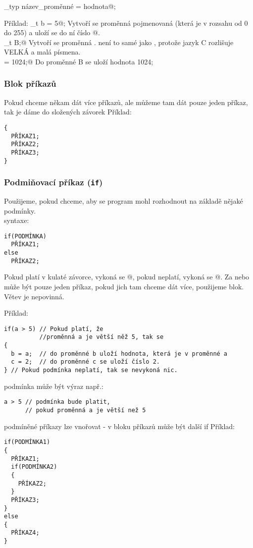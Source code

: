   _typ název_proměnné = hodnota@;

 Příklad: _t b = 5@;  Vytvoří se proměnná pojmenovaná \verb@b@ (která je v rozsahu od 0 do 255) a uloží se do ní číslo @. \\
_t B;@  Vytvoří se proměnná \verb@B@. \verb@B@ není to samé jako \verb@b@, protože jazyk C rozlišuje VELKÁ a malá písmena. \\
\verb@B = 1024;@  Do proměnné B se uloží hodnota 1024;

\subsubsection{Blok příkazů} 
Pokud chceme někam dát více příkazů, ale můžeme tam dát pouze jeden příkaz, tak je dáme do složených závorek
Příklad: \\ 
\begin{verbatim}
{
  PŘÍKAZ1;
  PŘÍKAZ2;
  PŘÍKAZ3;
}
\end{verbatim}



\subsubsection{Podmiňovací příkaz (\texttt{if})} \label{if1}

Použijeme, pokud chceme, aby se program mohl rozhodnout na základě nějaké podmínky. \\ 
syntaxe:

\begin{verbatim}
if(PODMÍNKA)
  PŘÍKAZ1;
else
  PŘÍKAZ2;
\end{verbatim}

Pokud platí  v kulaté závorce, vykoná se @, pokud neplatí, vykoná se @.
Za \verb@if@ nebo \verb@else@ může být pouze jeden příkaz, pokud jich tam chceme dát více, použijeme blok.
Větev \verb@else@ je nepovinná.

Příklad:
\begin{verbatim}
if(a > 5) // Pokud platí, že 
          //proměnná a je větší něž 5, tak se
{
  b = a;  // do proměnné b uloží hodnota, která je v proměnné a
  c = 2;  // do proměnné c se uloží číslo 2.
} // Pokud podmínka neplatí, tak se nevykoná nic.
\end{verbatim}

podmínka může být výraz např.: 
\begin{verbatim}
a > 5 // podmínka bude platit, 
      // pokud proměnná a je větší než 5
\end{verbatim}
podmíněné příkazy lze vnořovat - v bloku příkazů může být další if
Příklad:
\begin{verbatim}
if(PODMÍNKA1)
{
  PŘÍKAZ1;
  if(PODMÍNKA2)
  {
    PŘÍKAZ2;
  }
  PŘÍKAZ3;
}
else 
{
  PŘÍKAZ4;
}
\end{verbatim}

